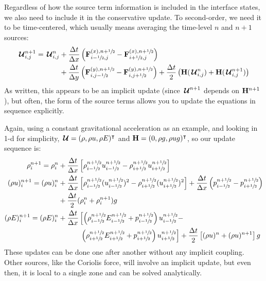Regardless of how the source term information is included in the
interface states, we also need to include it in the conservative
update.  To second-order, we need it to be time-centered, which
usually means averaging the time-level $n$ and $n+1$ sources:
\begin{align}
{\,\boldsymbol{\mathcal{U}}}^{n+1}_{i,j} = {\,\boldsymbol{\mathcal{U}}}^n_{i,j}
   &+ \frac{\Delta t}{\Delta x} \left ( {\bf F}^{(x),n+{\sfrac{1}{2}}}_{i-{\sfrac{1}{2}},j} - {\bf F}^{(x),n+{\sfrac{1}{2}}}_{i+{\sfrac{1}{2}},j} \right ) \nonumber \\
   &+ \frac{\Delta t}{\Delta y} \left ( {\bf F}^{(y),n+{\sfrac{1}{2}}}_{i,j-{\sfrac{1}{2}}} - {\bf F}^{(y),n+{\sfrac{1}{2}}}_{i,j+{\sfrac{1}{2}}} \right ) + \frac{\Delta t}{2} \left ({\bf H}({\,\boldsymbol{\mathcal{U}}}^n_{i,j}) + {\bf H}({\,\boldsymbol{\mathcal{U}}}^{n+1}_{i,j})\right )
\end{align}
As written, this appears to be an implicit update (since ${\,\boldsymbol{\mathcal{U}}}^{n+1}$
depends on ${\bf H}^{n+1}$), but often, the form of the source terms allows
you to update the equations in sequence explicitly.  

Again, using a constant gravitational acceleration as an example, and
looking in 1-d for simplicity, ${\,\boldsymbol{\mathcal{U}}} = (\rho, \rho u, \rho E)^\intercal$
and ${\bf H} = (0, \rho g, \rho u g)^\intercal$, so our update sequence is:
\begin{align}
\rho^{n+1}_i = \rho^n_i &+ \frac{\Delta t}{\Delta x} 
   \left [\rho_{i-\myhalf}^{n+\myhalf} u_{i-\myhalf}^{n+\myhalf} - 
          \rho_{i+\myhalf}^{n+\myhalf} u_{i+\myhalf}^{n+\myhalf} \right ] \\
(\rho u)^{n+1}_i = (\rho u)^n_i &+ \frac{\Delta t}{\Delta x} 
   \left [ \rho_{i-\myhalf}^{n+\myhalf} (u_{i-\myhalf}^{n+\myhalf})^2  - 
           \rho_{i+\myhalf}^{n+\myhalf} (u_{i+\myhalf}^{n+\myhalf})^2  \right ]
         + \frac{\Delta t}{\Delta x} \left ( p_{i-\myhalf}^{n+\myhalf} - 
                                              p_{i+\myhalf}^{n+\myhalf} \right ) \nonumber \\
       &+ \frac{\Delta t}{2}(\rho^n_i + \rho^{n+1}_i) g \\
(\rho E)^{n+1}_i = (\rho E)^n_i &+ \frac{\Delta t}{\Delta x} 
   \left [ \left (\rho_{i-\myhalf}^{n+\myhalf} E_{i-\myhalf}^{n+\myhalf}  + p_{i-\myhalf}^{n+\myhalf} \right ) u_{i-\myhalf}^{n+\myhalf} - \right . \nonumber \\
   &\phantom{+ \frac{\Delta t}{\Delta x} \left[ \right.}   \left .   \left (\rho_{i+\myhalf}^{n+\myhalf} E_{i+\myhalf}^{n+\myhalf}  + p_{i+\myhalf}^{n+\myhalf} \right ) u_{i+\myhalf}^{n+\myhalf} \right ]
    + \frac{\Delta t}{2} \left [ (\rho u)^n + (\rho u)^{n+1} \right] g
\end{align}
These updates can be done one after another without any implicit
coupling.  Other sources, like the Coriolis force, will involve an
implicit update, but even then, it is local to a single zone and can
be solved analytically.

